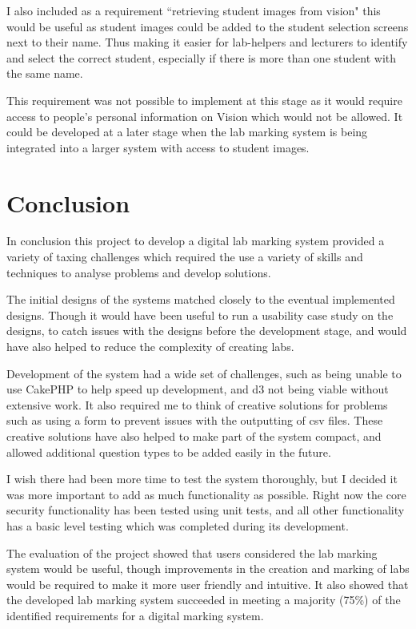 \documentclass[11pt]{report}
\begin{document}
I also included as a requirement ``retrieving student images from vision" this would be useful as student images could be added to the student selection screens next to their name. Thus making it easier for lab-helpers and lecturers to identify and select the correct student, especially if there is more than one student with the same name.

This requirement was not possible to implement at this stage as it would require access to people's personal information on Vision which would not be allowed. It could be developed at a later stage when the lab marking system is being integrated into a larger system with access to student images.





\section{Conclusion}

In conclusion this project to develop a digital lab marking system  provided a variety of taxing challenges which required the use a variety of skills and techniques to analyse problems and develop solutions.

The initial designs of the systems matched closely to the eventual implemented designs. Though it would have been useful to run a usability case study on the designs, to catch issues with the designs before the development stage, and would have also helped to reduce the complexity of creating labs.

Development of the system had a wide set of challenges, such as being unable to use CakePHP to help speed up development, and d3 not being viable without extensive work. It also required me to think of creative solutions for problems such as using a form to prevent issues with the outputting of csv files. These creative solutions have also helped to make part of the system compact, and allowed additional question types to be added easily in the future.

I wish there had been more time to test the system thoroughly, but I decided it was more important to add as much functionality as possible. Right now the core security functionality has been tested using unit tests, and all other functionality has a basic level testing which was completed during its development.

The evaluation of the project showed that users considered the lab marking system would be useful, though improvements in the creation and marking of labs would be required to make it more user friendly and intuitive. It also showed that the developed lab marking system succeeded in meeting a majority (75\%) of the identified requirements for a digital marking system. 
\end{document}
